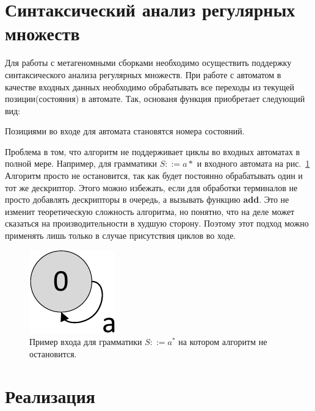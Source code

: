 \documentclass[14pt]{matmex-diploma-custom}
\begin{document}
	
	
	
	
	
	
    
    
    \section{Синтаксический анализ регулярных множеств}
    Для работы с метагеномными сборками необходимо осуществить поддержку синтаксического анализа регулярных множеств.
    При работе с автоматом в качестве входных данных необходимо обрабатывать все переходы из текущей позиции(состояния) в автомате.
    Так, основаня функция приобретает следующий вид:
    
    Позициями во входе для автомата становятся номера состояний. 
    
    Проблема в том, что алгоритм не поддерживает
    циклы во входных автоматах в полной мере. Например, для грамматики $S ::= a*$ и входного автомата на рис.~\ref{graphEx}
    Алгоритм просто не остановится, так как будет постоянно обрабатывать один и тот же дескриптор.
    Этого можно избежать, если для обработки терминалов не просто добавлять дескрипторы в очередь, а вызывать функцию \textbf{add}.
    Это не изменит теоретическую сложность алгоритма, но понятно, что на деле может сказаться на производительности в худшую сторону.
    Поэтому этот подход можно применять лишь только в случае присутствия циклов во ходе.
    \begin{figure}[ht]   
        \centering
        \includegraphics[scale=.5]{pictures/graphEx.pdf}
        \caption{Пример входа для грамматики $S ::= a^*$ на котором алгоритм не остановится.}
        \label{graphEx}
    \end{figure}

    \section{Реализация}
    
\end{document}
